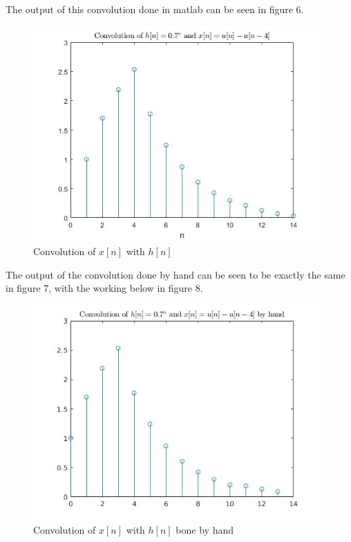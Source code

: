 \documentclass[a4paper,11pt]{article}
\begin{document}
The output of this convolution done in matlab can be seen in figure 6.\\
\begin{figure}[h]
\centering
\includegraphics[width=11cm]{Convolution.jpg}
\caption{Convolution of $x[n]$ with $h[n]$}
\end{figure}

The output of the convolution done by hand can be seen to be exactly the same in figure 7, with the working below in figure 8.\\

\begin{figure}[h]
\centering
\includegraphics[width=11cm]{Convolutionbyhand.jpg}
\caption{Convolution of $x[n]$ with $h[n]$ bone by hand}
\end{figure}
\end{document}
